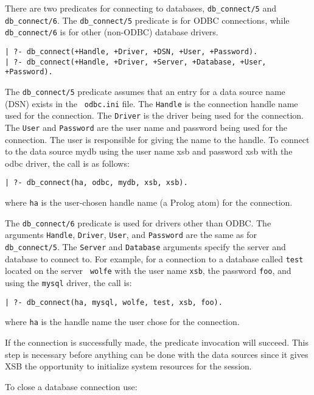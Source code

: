 There are two predicates for connecting to databases, {\tt db\_connect/5}
and {\tt db\_connect/6}.
The {\tt db\_connect/5} predicate is for ODBC connections, while {\tt
  db\_connect/6} is 
for other (non-ODBC) database drivers.

\begin{verbatim}
| ?- db_connect(+Handle, +Driver, +DSN, +User, +Password).
| ?- db_connect(+Handle, +Driver, +Server, +Database, +User, +Password).
\end{verbatim}

The {\tt db\_connect/5} predicate
assumes that an entry for a data source name (DSN) exists in the {\tt
  odbc.ini} file. The {\tt Handle} is the connection handle name used for the
connection. The {\tt Driver} is the driver being used for the connection.
The {\tt User} and {\tt Password} are the user name and password being used
for the connection. The user is responsible for giving the name to the
handle.  To connect to the data source mydb using the user name xsb and
password xsb with the odbc driver, the call is as follows:

\begin{verbatim}
| ?- db_connect(ha, odbc, mydb, xsb, xsb).
\end{verbatim}

\noindent
where {\tt ha} is the user-chosen handle name (a Prolog atom) for the
connection.

The {\tt db\_connect/6} predicate is used for drivers other than ODBC.  The
arguments {\tt Handle}, {\tt Driver}, {\tt User}, and {\tt Password} are
the same as for {\tt db\_connect/5}. The {\tt Server} and {\tt Database}
arguments specify the server and database to connect to.  For example, for
a connection to a database called {\tt test} located on the server {\tt
  wolfe} with the user name {\tt xsb}, the password {\tt foo}, and using
the {\tt mysql} driver, the call is:

\begin{verbatim}
| ?- db_connect(ha, mysql, wolfe, test, xsb, foo).
\end{verbatim}

\noindent
where {\tt ha} is the handle name the user chose for the connection.

If the connection is successfully made, the predicate invocation will
succeed.  This step is necessary before anything can be done with the
data sources since it gives XSB the opportunity to initialize system
resources for the session.

To close a database connection use:

